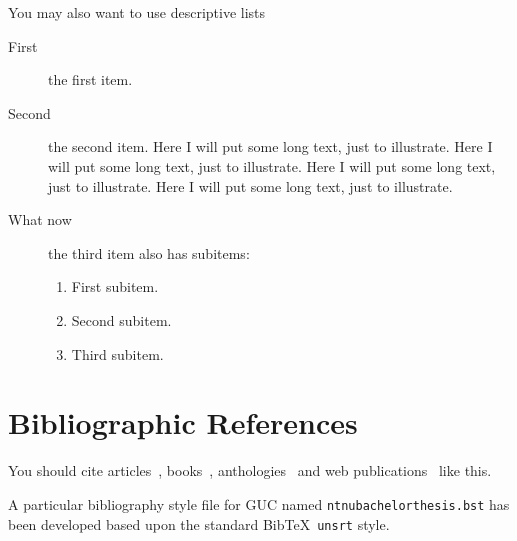 You may also want to use descriptive lists
\begin{description}
	\item[First] the first item.
	\item[Second] the second item. Here I will put some long text, just to illustrate.
	  Here I will put some long text, just to illustrate. Here I will put
	  some long text, just to illustrate. Here I will put some long text,
	  just to illustrate.
	\item [What now] the third item also has subitems:
	  \begin{enumerate}
		  \item First subitem.
		  \item Second subitem.
		  \item Third subitem.
	  \end{enumerate}
\end{description}


\section{Bibliographic References}

You should cite articles~\cite{Askvall1985}, books~\cite{Card1983},
anthologies~\cite{Lancaster1985} and web publications~\cite{Meldon1997}
like this.


A particular bibliography style file for GUC named
\texttt{ntnubachelorthesis.bst} has been developed based upon the
standard Bib\TeX\ \texttt{unsrt} style.
